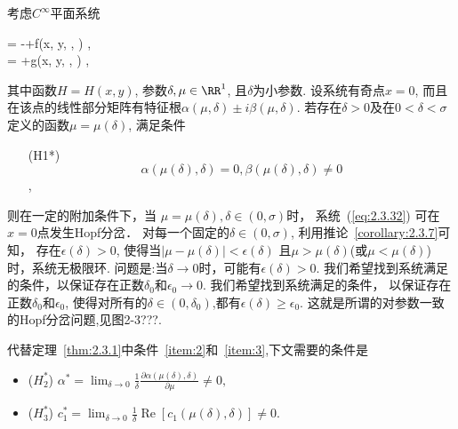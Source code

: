考虑$C^{\infty}$平面系统
\begin{ode}
  \label{eq:2.3.32}
  \dxdt = -+\delta f(x, y, \mu, \delta)  ,\\
  \dydt = +\delta g(x, y, \mu, \delta) ,
\end{ode}
其中函数$H=H(x,y)$,
参数$\delta,\mu \in \RR^1$,
且$\delta$为小参数.
设系统有奇点$x=0$,
而且在该点的线性部分矩阵有特征根$\alpha(\mu,\delta)\pm i \beta(\mu,\delta)$.
若存在$\delta>0$及在$0<\delta<\sigma$定义的函数$\mu=\mu(\delta)$,
满足条件
\begin{enumerate}
\item[(H1*)]\label{item:14}
  $$\alpha(\mu(\delta),\delta)=0,\beta(\mu(\delta),\delta) \neq 0$$,
\end{enumerate}
则在一定的附加条件下，当
$\mu=\mu(\delta),\delta \in (0,\sigma)$时，
系统~(\ref{eq:2.3.32})
可在$x=0$点发生Hopf分岔．
对每一个固定的$\delta \in (0,\sigma)$,
利用推论~\ref{corollary:2.3.7}可知，
存在$\epsilon(\delta)>0$,
使得当$|\mu-\mu(\delta)|<\epsilon(\delta)$
且$\mu>\mu(\delta)$(或$\mu<\mu(\delta)$)时，系统无极限环.
问题是:当$\delta \to 0$时，可能有$\epsilon(\delta)>0$.
我们希望找到系统满足的条件，以保证存在正数$\delta_0$和$\epsilon_0 \to 0$.
我们希望找到系统满足的条件，
以保证存在正数$\delta_0$和$\epsilon_0$,
使得对所有的$\delta\in (0,\delta_{0})$,都有$\epsilon(\delta)\geqslant \epsilon_0$.
这就是所谓的对参数一致的Hopf分岔问题,见图2-3???.

代替定理~\ref{thm:2.3.1}中条件~\ref{item:2}和~\ref{item:3},下文需要的条件是
\begin{itemize}
\item ($H_2^*$) $
\alpha^{*}=\lim _{\delta \rightarrow 0} \frac{1}{\delta} \frac{\partial \alpha(\mu(\delta), \delta)}{\partial \mu} \neq 0,
$
\item ($H_3^*$)
  $c_{1}^{*}=\lim _{\delta \rightarrow 0} \frac{1}{\delta} \operatorname{Re}\left[c_{1}(\mu(\delta), \delta)\right] \neq 0.$
\end{itemize}

\begin{theorem}
  
\end{theorem}

